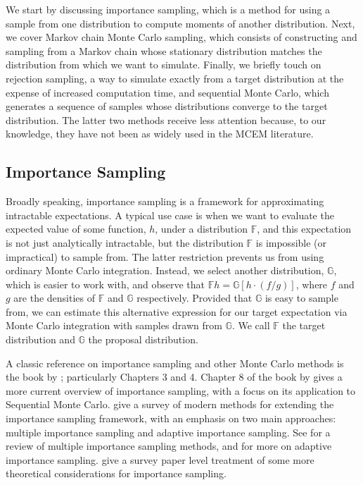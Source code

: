 \documentclass[11pt, oneside]{article}   	%
\newcommand{\bF}{\mathbb{F}}
\newcommand{\bG}{\mathbb{G}}
\begin{document}
We start by discussing importance sampling, which is a method for using a sample from one distribution to compute moments of another distribution. Next, we cover Markov chain Monte Carlo sampling, which consists of constructing and sampling from a Markov chain whose stationary distribution matches the distribution from which we want to simulate. Finally, we briefly touch on rejection sampling, a way to simulate exactly from a target distribution at the expense of increased computation time, and sequential Monte Carlo, which generates a sequence of samples whose distributions converge to the target distribution. The latter two methods receive less attention because, to our knowledge, they have not been as widely used in the MCEM literature.

\subsection{Importance Sampling}
\label{sec2:imp_samp}

Broadly speaking, importance sampling is a framework for approximating intractable expectations. A typical use case is when we want to evaluate the expected value of some function, $h$, under a distribution $\bF$, and this expectation is not just analytically intractable, but the distribution $\bF$ is impossible (or impractical) to sample from. The latter restriction prevents us from using ordinary Monte Carlo integration. Instead, we select another distribution, $\bG$, which is easier to work with, and observe that $\bF h = \bG [h \cdot (f/g)]$, where $f$ and $g$ are the densities of $\bF$ and $\bG$ respectively. Provided that $\bG$ is easy to sample from, we can estimate this alternative expression for our target expectation via Monte Carlo integration with samples drawn from $\bG$. We call $\bF$ the target distribution and $\bG$ the proposal distribution.  

A classic reference on importance sampling and other Monte Carlo methods is the book by \citet{Rob04}; particularly Chapters 3 and 4. Chapter 8 of the book by \citet{Cho20} gives a more current overview of importance sampling, with a focus on its application to Sequential Monte Carlo. \citet{Elv22} give a survey of modern methods for extending the importance sampling framework, with an emphasis on two main approaches: multiple importance sampling and adaptive importance sampling. See \citet{Elv19} for a review of multiple importance sampling methods, and \citet{Bug17} for more on adaptive importance sampling. \citet{Aga17} give a survey paper level treatment of some more theoretical considerations for importance sampling.
\end{document}
